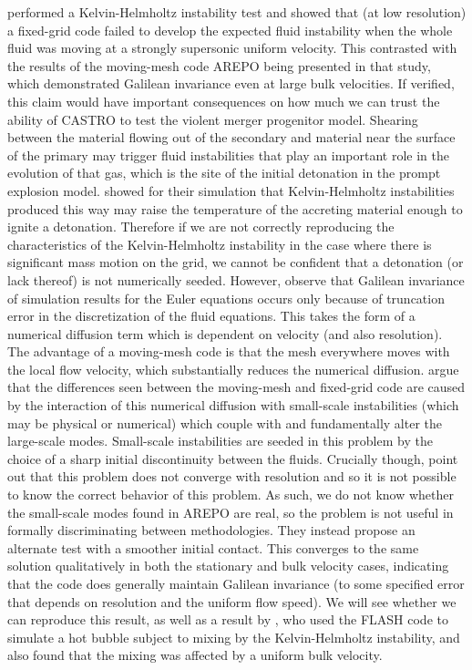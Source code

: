 \documentclass[12pt,preprint]{aastex}
\begin{document}
\citet{arepo} performed a Kelvin-Helmholtz instability test and showed that (at low resolution) a fixed-grid code failed to develop the expected fluid instability when the whole fluid was moving at a strongly supersonic uniform velocity. This contrasted with the results of the moving-mesh code AREPO being presented in that study, which demonstrated Galilean invariance even at large bulk velocities. If verified, this claim would have important consequences on how much we can trust the ability of CASTRO to test the violent merger progenitor model. Shearing between the material flowing out of the secondary and material near the surface of the primary may trigger fluid instabilities that play an important role in the evolution of that gas, which is the site of the initial detonation in the prompt explosion model. \citet{guillochon:2010} showed for their simulation that Kelvin-Helmholtz instabilities produced this way may raise the temperature of the accreting material enough to ignite a detonation. Therefore if we are not correctly reproducing the characteristics of the Kelvin-Helmholtz instability in the case where there is significant mass motion on the grid, we cannot be confident that a detonation (or lack thereof) is not numerically seeded. However, \citet{robertson:2010} observe that Galilean invariance of simulation results for the Euler equations occurs only because of truncation error in the discretization of the fluid equations. This takes the form of a numerical diffusion term which is dependent on velocity (and also resolution). The advantage of a moving-mesh code is that the mesh everywhere moves with the local flow velocity, which substantially reduces the numerical diffusion. \citeauthor{robertson:2010} argue that the differences seen between the moving-mesh and fixed-grid code are caused by the interaction of this numerical diffusion with small-scale instabilities (which may be physical or numerical) which couple with and fundamentally alter the large-scale modes. Small-scale instabilities are seeded in this problem by the choice of a sharp initial discontinuity between the fluids. Crucially though, \citeauthor{robertson:2010} point out that this problem does not converge with resolution and so it is not possible to know the correct behavior of this problem. As such, we do not know whether the small-scale modes found in AREPO are real, so the problem is not useful in formally discriminating between methodologies. They instead propose an alternate test with a smoother initial contact. This converges to the same solution qualitatively in both the stationary and bulk velocity cases, indicating that the code does generally maintain Galilean invariance (to some specified error that depends on resolution and the uniform flow speed).  We will see whether we can reproduce this result, as well as a result by \cite{wadsley:2008}, who used the FLASH code to simulate a hot bubble subject to mixing by the Kelvin-Helmholtz instability, and also found that the mixing was affected by a uniform bulk velocity.
\end{document}

